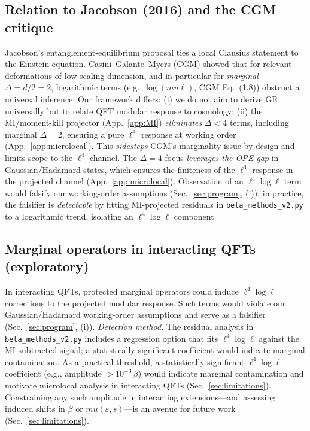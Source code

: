 \documentclass[aps,prd,onecolumn,superscriptaddress,nofootinbib]{revtex4-2}
\def\mu{mu}%
\begin{document}
\subsection{Relation to Jacobson (2016) and the CGM critique}
Jacobson’s entanglement-equilibrium proposal \cite{Jacobson2016} ties a local Clausius statement to the Einstein equation. Casini--Galante--Myers (CGM) \cite{CasiniGalanteMyers2016} showed that for relevant deformations of low scaling dimension, and in particular for \emph{marginal} \(\Delta=d/2=2\), logarithmic terms (e.g.\ \(\log(\mu\ell)\), CGM Eq.~(1.8)) obstruct a universal inference. Our framework differs: (i) we do not aim to derive GR universally but to relate QFT modular response to cosmology; (ii) the MI/moment-kill projector (App.~\ref{app:MI}) \emph{eliminates} \(\Delta<4\) terms, including marginal \(\Delta=2\), ensuring a pure \(\ell^4\) response at working order (App.~\ref{app:microlocal}). This \emph{sidesteps} CGM’s marginality issue by design and limits scope to the \(\ell^4\) channel. The \(\Delta=4\) focus \emph{leverages the OPE gap} in Gaussian/Hadamard states, which ensures the finiteness of the \(\ell^4\) response in the projected channel (App.~\ref{app:microlocal}). Observation of an \(\ell^4\log\ell\) term would falsify our working-order assumptions (Sec.~\ref{sec:program}, (i)); in practice, the falsifier is \emph{detectable} by fitting MI-projected residuals in \texttt{beta\_methods\_v2.py} to a logarithmic trend, isolating an \(\ell^4\log\ell\) component.

\subsection{Marginal operators in interacting QFTs (exploratory)}
In interacting QFTs, protected marginal operators could induce \(\ell^4\log\ell\) corrections to the projected modular response. Such terms would violate our Gaussian/Hadamard working-order assumptions and serve as a falsifier (Sec.~\ref{sec:program}, (i)). \emph{Detection method.} The residual analysis in \texttt{beta\_methods\_v2.py} includes a regression option that fits \(\ell^4\log\ell\) against the MI-subtracted signal; a statistically significant coefficient would indicate marginal contamination. As a practical threshold, a statistically significant \(\ell^4\log\ell\) coefficient (e.g., amplitude \(>10^{-3}\,\beta\)) would indicate marginal contamination and motivate microlocal analysis in interacting QFTs (Sec.~\ref{sec:limitations}). Constraining any such amplitude in interacting extensions—and assessing induced shifts in \(\beta\) or \(\mu(\varepsilon,s)\)—is an avenue for future work (Sec.~\ref{sec:limitations}).
\end{document}

